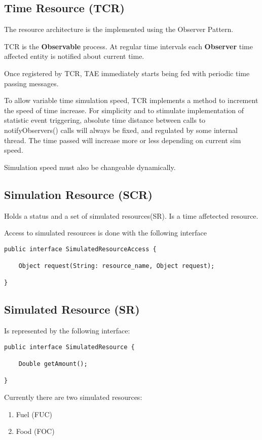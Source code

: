\subsection{Time Resource (TCR)} 

The resource architecture is the implemented using the Observer Pattern.

TCR is the \textbf{Observable} process. At regular time intervals each
\textbf{Observer} time affected entity is notified about current time.

Once registered by TCR, TAE immediately starts being fed with periodic time
passing messages.

To allow variable time simulation speed, TCR implements a method to increment
the speed of time increase. For simplicity and to stimulate implementation of
statistic event triggering, absolute time distance between calls to
notifyObservers() calls will always be fixed, and regulated by some internal
thread. The time passed will increase more or less depending on current sim
speed.

Simulation speed must also be changeable dynamically.




\subsection{Simulation Resource (SCR)} 

Holds a status and a set of simulated resources(SR). Is a time affetected
resource.

Access to simulated resources is done with the following interface

\begin{verbatim}
public interface SimulatedResourceAccess {
	
	Object request(String: resource_name, Object request); 

}
\end{verbatim}




\subsection{Simulated Resource (SR)} 

Is represented by the following interface:

\begin{verbatim}
public interface SimulatedResource {
	
	Double getAmount();

}
\end{verbatim}

Currently there are two simulated resources:

\begin{enumerate}
  \item Fuel (FUC)
  \item Food (FOC)
\end{enumerate}
